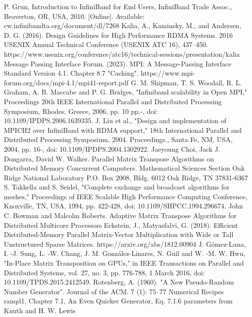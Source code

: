 \documentclass[conference]{IEEEtran}
\begin{document}
\begin{thebibliography}{00}
 P. Grun, Introduction to InfiniBand for End Users, InfiniBand
Trade Assoc., Beaverton, OR, USA, 2010. [Online]. Available:
cw.infinibandta.org/document/dl/7268
 Kalia, A., Kaminsky, M., and Andersen, D. G. (2016). Design Guidelines for High Performance RDMA Systems. 2016 USENIX Annual Technical Conference (USENIX ATC 16), 437–450. https://www.usenix.org/conference/atc16/technical-sessions/presentation/kalia 
 Message Passing Interface Forum. (2023). MPI: A Message-Passing Interface Standard Version 4.1. Chapter 8.7 "Caching". https://www.mpi-forum.org/docs/mpi-4.1/mpi41-report.pdf 
 G. M. Shipman, T. S. Woodall, R. L. Graham, A. B. Maccabe and P. G. Bridges, "Infiniband scalability in Open MPI," Proceedings 20th IEEE International Parallel and Distributed Processing Symposium, Rhodes, Greece, 2006, pp. 10 pp.-, doi: 10.1109/IPDPS.2006.1639335.
 J. Liu et al., "Design and implementation of MPICH2 over InfiniBand with RDMA support," 18th International Parallel and Distributed Processing Symposium, 2004. Proceedings., Santa Fe, NM, USA, 2004, pp. 16-, doi: 10.1109/IPDPS.2004.1302922.
 Jaeyoung Choi, Jack J. Dongarra, David W. Walker.  Parallel Matrix Transpose Algorithms on Distributed Memory Concurrent Computers.  Mathematical Sciences Section Oak Ridge National Laboratory P.O. Box 2008, Bldg. 6012 Oak Ridge, TN 37831-6367
 S. Takkella and S. Seidel, "Complete exchange and broadcast algorithms for meshes," Proceedings of IEEE Scalable High Performance Computing Conference, Knoxville, TN, USA, 1994, pp. 422-428, doi: 10.1109/SHPCC.1994.296674.
 John C. Bowman and Malcolm Roberts. Adaptive Matrix Transpose Algorithms for Distributed Multicore Processors
 Eckstein, J., Matyasfalvi, G. (2018). Efficient Distributed-Memory Parallel Matrix-Vector Multiplication with Wide or Tall Unstructured Sparse Matrices. https://arxiv.org/abs/1812.00904 
 J. Gómez-Luna, I. -J. Sung, L. -W. Chang, J. M. González-Linares, N. Guil and W. -M. W. Hwu, "In-Place Matrix Transposition on GPUs," in IEEE Transactions on Parallel and Distributed Systems, vol. 27, no. 3, pp. 776-788, 1 March 2016, doi: 10.1109/TPDS.2015.2412549.
 Rotenberg, A. (1960). "A New Pseudo-Random Number Generator". Journal of the ACM. 7 (1): 75–77
 Numerical Recipes ranqd1, Chapter 7.1, An Even Quicker Generator, Eq. 7.1.6
parameters from Knuth and H. W. Lewis
\end{thebibliography}
\vspace{12pt}
\end{document}
